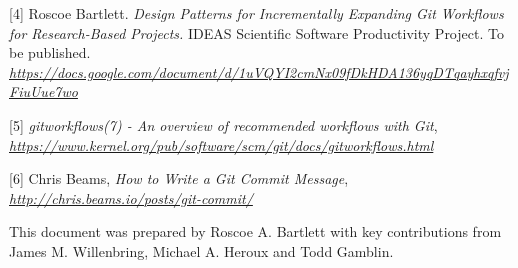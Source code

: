 \documentclass[]{article}
\begin{document}
\protect\hypertarget{id.bol9ubml03th}{}{}{[}4{]} Roscoe Bartlett.
\emph{Design Patterns for Incrementally Expanding Git Workflows for
Research-Based Projects.} IDEAS Scientific Software Productivity
Project. To be published. \newline
\href{https://docs.google.com/document/d/1uVQYI2cmNx09fDkHDA136yqDTqayhxqfvjFiuUue7wo}{\emph{https://docs.google.com/document/d/1uVQYI2cmNx09fDkHDA136yqDTqayhxqfvjFiuUue7wo}}

\protect\hypertarget{id.m6th6vxlbrrd}{}{}{[}5{]} \emph{gitworkflows(7) -
An overview of recommended workflows with Git}, \newline
\href{https://www.kernel.org/pub/software/scm/git/docs/gitworkflows.html}{\emph{https://www.kernel.org/pub/software/scm/git/docs/gitworkflows.html}}

\protect\hypertarget{id.duiqy3srokip}{}{}{[}6{]} Chris Beams, \emph{How
to Write a Git Commit Message},
\href{http://chris.beams.io/posts/git-commit/}{\emph{http://chris.beams.io/posts/git-commit/}}

This document was prepared by Roscoe A. Bartlett with key contributions
from James M. Willenbring, Michael A. Heroux and Todd Gamblin.
\end{document}
